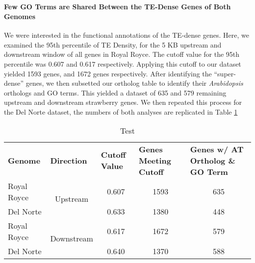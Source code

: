 \documentclass[fleqn,10pt]{olplainarticle}
\begin{document}
\subsection{}

\paragraph{Few GO Terms are Shared Between the TE-Dense Genes of Both Genomes}
We were interested in the functional annotations of the TE-dense genes.
Here, we examined the 95th percentile of TE Density, for the 5 KB upstream and downstream window of all genes in Royal Royce.
The cutoff value for the 95th percentile was 0.607 and 0.617 respectively.
Applying this cutoff to our dataset yielded 1593 genes, and 1672 genes respectively.
After identifying the ``super-dense'' genes, we then subsetted our ortholog table to identify their \textit{Arabidopsis} orthologs and GO terms.
This yielded a dataset of 635 and 579 remaining upstream and downstream strawberry genes.
We then repeated this process for the Del Norte dataset, the numbers of both analyses are replicated in Table \ref{tab:go_compare_TIR_5K}

\begin{table}[h]
\begin{tabular}{lcccc}
\textbf{Genome}                  & \multicolumn{1}{l}{\textbf{Direction}} & \multicolumn{1}{l}{\textbf{Cutoff Value}} & \multicolumn{1}{l}{\textbf{Genes Meeting Cutoff}} & \multicolumn{1}{l}{\textbf{Genes w/ AT Ortholog \& GO Term}} \\
\multicolumn{1}{l|}{Royal Royce} & \multirow{2}{*}{Upstream}              & 0.607                                     & 1593                                              & 635                                                          \\
\multicolumn{1}{l|}{Del Norte}   &                                        & 0.633                                     & 1380                                              & 448                                                          \\ \hline
\multicolumn{1}{l|}{Royal Royce} & \multirow{2}{*}{Downstream}            & 0.617                                     & 1672                                              & 579                                                          \\
\multicolumn{1}{l|}{Del Norte}   &                                        & 0.640                                     & 1370                                              & 588                                                         
\end{tabular}
\caption{Test}
\label{tab:go_compare_TIR_5K}
\end{table}
\end{document}
